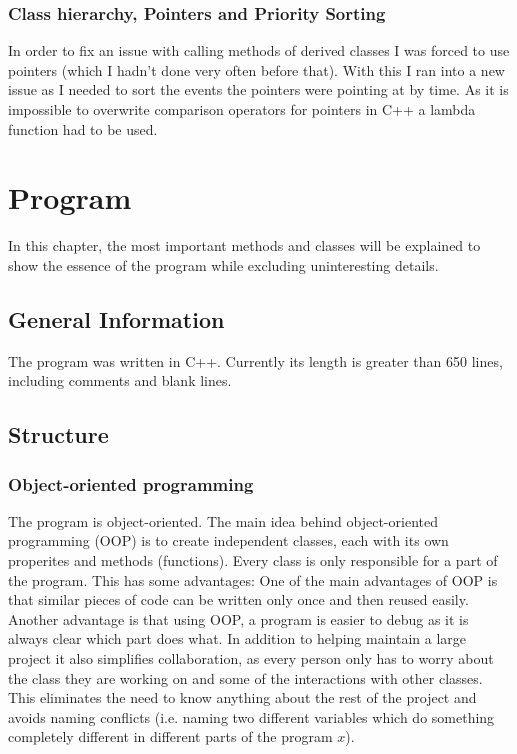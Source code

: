\documentclass[10pt]{report}
\begin{document}
\subsection{Class hierarchy, Pointers and Priority Sorting}
In order to fix an issue with calling methods of derived classes I was forced to use pointers (which I hadn't done very often before that). With this I ran into a new issue as I needed to sort the events the pointers were pointing at by time. As it is impossible to overwrite comparison operators for pointers in C++ a lambda function had to be used. 

\chapter{Program}

In this chapter, the most important methods and classes will be explained to show the essence of the program while excluding uninteresting details.

\section{General Information}
The program was written in C++. Currently its length is greater than 650 lines, including comments and blank lines. 

\section{Structure}

\subsection{Object-oriented programming}
The program is object-oriented. The main idea behind object-oriented programming (OOP) is to create independent classes, each with its own properites and methods (functions). Every class is only responsible for a part of the program. This has some advantages: One of the main advantages of OOP is that similar pieces of code can be written only once and then reused easily. Another advantage is that using OOP, a program is easier to debug as it is always clear which part does what. In addition to helping maintain a large project it also simplifies collaboration, as every person only has to worry about the class they are working on and some of the interactions with other classes. This eliminates the need to know anything about the rest of the project and avoids naming conflicts (i.e. naming two different variables which do something completely different in different parts of the program $x$). 
\end{document}
